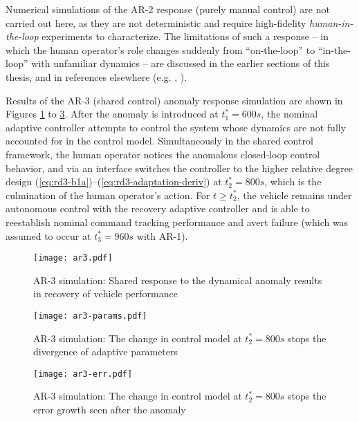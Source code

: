 Numerical simulations of the AR-2 response (purely manual control) are not carried out here, as they are not deterministic and require high-fidelity \textit{human-in-the-loop} experiments to characterize. The limitations of such a response -- in which the human operator's role changes suddenly from ``on-the-loop'' to ``in-the-loop'' with unfamiliar dynamics -- are discussed in the earlier sections of this thesis, and in references elsewhere (e.g. \cite{endsley1996automation}, \cite{hess2015modeling}).

Results of the AR-3 (shared control) anomaly response simulation are shown in Figures \ref{fig:ar3-sim} to \ref{fig:ar3-err}. After the anomaly is introduced at $t_1^* = 600 s$, the nominal adaptive controller attempts to control the system whose dynamics are not fully accounted for in the control model. Simultaneously in the shared control framework, the human operator notices the anomalous closed-loop control behavior, and via an interface switches the controller to the higher relative degree design (\ref{eq:rd3-b1a})--(\ref{eq:rd3-adaptation-deriv}) at $t_2^* = 800 s$, which is the culmination of the human operator's action. For $t \geq t_2^*$, the vehicle remains under autonomous control with the recovery adaptive controller and is able to reestablish nominal command tracking performance and avert failure (which was assumed to occur at $t_3^* = 960 s$ with AR-1).

\begin{figure}[htbp]
	\centering
	\texttt{[image: ar3.pdf]}
	\caption{AR-3 simulation: Shared response to the dynamical anomaly results in recovery of vehicle performance}
	\label{fig:ar3-sim}
\end{figure}

\begin{figure}[htbp]
	\centering
	\texttt{[image: ar3-params.pdf]}
	\caption{AR-3 simulation: The change in control model at $t_2^* = 800 s$ stops the divergence of adaptive parameters}
	\label{fig:ar3-params}
\end{figure}

\begin{figure}[htbp]
	\centering
	\texttt{[image: ar3-err.pdf]}
	\caption{AR-3 simulation: The change in control model at $t_2^* = 800 s$ stops the error growth seen after the anomaly}
	\label{fig:ar3-err}
\end{figure}


